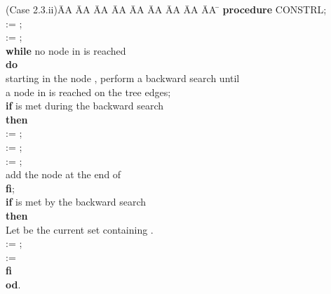 \documentclass[12pt,twoside,a4paper]{article}
\begin{document}
\begin{tabbing}
(Case 2.3.ii)\= AA \= AA \= AA \= AA \= AA \= AA \= AA \= AA \= AA \= \kill
\> {\bf procedure} CONSTRL; \\
\>  := ; \\
\>  := ; \\
\> {\bf while} no node in  is reached \\
\> {\bf do} \\
\> \> starting in the node , perform a backward search until \\ 
\> \> a node in  is reached on the tree edges; \\
\> \> {\bf if}  is met during the backward search \\ 
\> \> {\bf then} \\
\> \> \>  := ; \\
\> \> \>  := ; \\
\> \> \>  := ; \\
\> \> \> add the node  at the end of  \\
\> \> {\bf fi}; \\
\> \> {\bf if}  is met by the backward search \\
\> \> {\bf then} \\
\> \> \>  Let  be the current set containing . \\
\> \> \>  := ; \\
\> \> \>  :=  \\
\> \> {\bf fi} \\
\> {\bf od}. \\
\end{tabbing}
\end{document}
